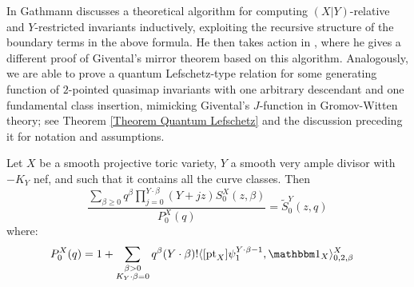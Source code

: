 In \cite{Ga} Gathmann discusses a theoretical algorithm for computing $(X|Y)$-relative and $Y$-restricted invariants inductively, exploiting the recursive structure of the boundary terms in the above formula. He then takes action in \cite{Ga-MF}, where he gives a different proof of Givental's mirror theorem based on this algorithm. Analogously, we are able to prove a quantum Lefschetz-type relation for some generating function of $2$-pointed quasimap invariants with one arbitrary descendant and one fundamental class insertion, mimicking Givental's $J$-function in Gromov-Witten theory; see Theorem \ref{Theorem Quantum Lefschetz} and the discussion preceding it for notation and assumptions.
\begin{thm*}
Let $X$ be a smooth projective toric variety, $Y$ a smooth very ample divisor with $-K_Y$ nef, and such that it contains all the curve classes. Then
\begin{equation*}
\dfrac{\sum_{\beta\geq 0} q^\beta\prod_{j=0}^{Y\cdot\beta}(Y+jz)S_0^X(z,\beta)}{P_0^X(q)}= \tilde{S}_0^Y(z,q)
\end{equation*}
where:
\begin{align*}
 P_0^X(q) %
            & = 1 + \sum_{\substack{\beta>0 \\ K_Y\cdot\beta=0}} q^\beta(Y\cdot\beta)!\langle [\pt_X] \psi_1^{Y\cdot\beta-1} ,\mathbbm 1_{X}\rangle_{0,2,\beta}^X
\end{align*}
\end{thm*}

\smallskip

